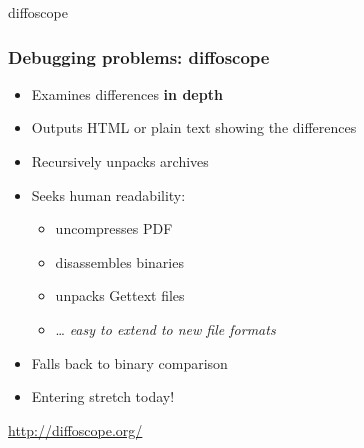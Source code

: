 \documentclass[14pt,aspectratio=169]{beamer}
\begin{document}
{
\begin{frame}{diffoscope}
 \frametitle{Debugging problems: diffoscope}

 \begin{itemize}
  \item Examines differences \textbf{in depth}
  \item Outputs HTML or plain text showing the differences
  \item Recursively unpacks archives
  \item Seeks human readability:
   \begin{itemize}
    \item uncompresses PDF
    \item disassembles binaries
    \item unpacks Gettext files
    \item … \textit{easy to extend to new file formats}
   \end{itemize}
  \item Falls back to binary comparison
  \item Entering stretch today!
 \end{itemize}
 \vfill
 \begin{center}
  \url{http://diffoscope.org/}\\
  {\footnotesize {}}
 \end{center}
\end{frame}
}
\end{document}
